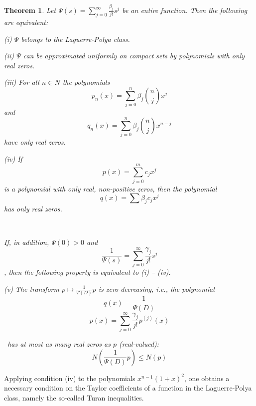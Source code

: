 \documentclass{article}
\newcommand{\tmem}[1]{{\em #1\/}}
\newtheorem{tm}{Theorem}
\newtheorem{tm}{Theorem}
\providecommand{\*}{{\opl}}
\newcommand{\field}[1]{#1}
\newcommand{\bN}{\field{N}}
\newcommand{\<}{}
\newcommand{\>}{}
\newcommand{\lpc}{Laguerre-Polya class}
\begin{document}
\begin{tm}
  \label{tm:lpcc}Let $\Psi (s) = \sum_{j = 0}^{\infty} \frac{\beta_j}{j!} s^j$
  be an entire function. Then the following are equivalent:
  
  (i) $\Psi$ belongs to the {\lpc}.
  
  (ii) $\Psi$ can be approximated uniformly on compact sets by polynomials
  with only real zeros.
  
  (iii) For all $n \in \bN$ the polynomials
  \begin{equation}
    p_n (x) = \sum_{j = 0}^n \beta_j \binom{n}{j} x^j
  \end{equation}
  and
  \begin{equation}
    q_n (x) = \sum_{j = 0}^n \beta_j \binom{n}{j} x^{n - j}
  \end{equation}
  have only real zeros.
  
  (iv) If
  \begin{equation}
    p (x) = \sum_{j = 0}^m c_j x^j
  \end{equation}
  is a polynomial with only real, {\tmem{non-positive}} zeros, then the
  polynomial
  \begin{equation}
    q (x) = \sum \beta_j c_j x^j
  \end{equation}
  has only real zeros.
  
  \
  
  If, in addition, $\Psi (0) > 0$ and
  \begin{equation}
    \frac{1}{\Psi (s)} = \sum_{j = 0}^{\infty} \frac{\gamma_j}{j!} s^j
  \end{equation}
  , then the following property is equivalent to (i) -- (iv).
  
  (v) The transform $p \mapsto \frac{1}{\Psi (D)} p$ is zero-decreasing, i.e.,
  the polynomial
  \begin{equation}
    q (x) = \frac{1}{\Psi (D)}
  \end{equation}
  \begin{equation}
    p (x) = \sum_{j = 0}^{\infty} \frac{\gamma_j}{j!} p^{(j)} (x)
  \end{equation}
  
  
  \ has at most as many real zeros as $p$ (real-valued):
  \begin{equation}
    N \left( \frac{1}{\Psi (D)} p \right) \leq N (p)
  \end{equation}
\end{tm}

Applying condition (iv) to the polynomials $x^{n - 1}  (1 + x)^2$, one obtains
a necessary condition on the Taylor coefficients of a function in the {\lpc},
namely the so-called Turan inequalities.
\end{document}
